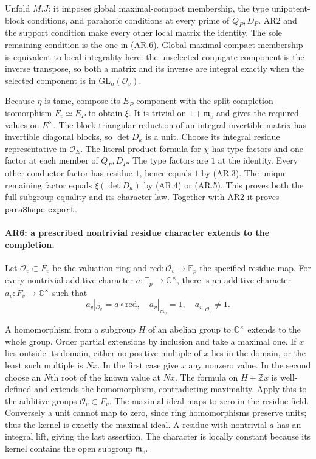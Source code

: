 Unfold $M.J$: it imposes global maximal-compact membership, the type
unipotent-block conditions, and parahoric conditions at every prime
of $Q_P,D_P$. AR2 and the support condition make every other local
matrix the identity. The sole remaining condition is the one in
(AR.6). Global maximal-compact membership is equivalent to local
integrality here: the unselected conjugate component is the inverse
transpose, so both a matrix and its inverse are integral exactly when
the selected component is in $\mathrm{GL}_n(\mathcal O_v)$.

Because $\eta$ is tame, compose its $E_P$ component with the split
completion isomorphism $F_v\simeq E_P$ to obtain $\xi$. It is trivial
on $1+\mathfrak m_v$ and gives the required values on $E^\times$.
The block-triangular reduction of an integral invertible matrix has
invertible diagonal blocks, so $\det D_\kappa$ is a unit. Choose its
integral residue representative in $\mathcal O_E$.
The literal product formula for $\chi$ has type factors and one
factor at each member of $Q_P,D_P$. The type factors are $1$ at the
identity. Every other conductor factor has residue $1$, hence equals
$1$ by (AR.3). The unique remaining factor equals
$\xi(\det D_\kappa)$ by (AR.4) or (AR.5).
This proves both the full subgroup equality and its character law.
Together with AR2 it proves $\texttt{paraShape\_export}$.

\paragraph{AR6: a prescribed nontrivial residue character extends to the completion.}
Let $\mathcal O_v\subset F_v$ be the valuation ring and
$\mathrm{red}:\mathcal O_v\to\mathbb F_p$ the specified residue map.
For every nontrivial additive character
$a:\mathbb F_p\to\mathbb C^\times$, there is an additive character
$a_v:F_v\to\mathbb C^\times$ such that
\[
 a_v|_{\mathcal O_v}=a\circ\mathrm{red},\quad
 a_v|_{\mathfrak m_v}=1,\quad
 a_v|_{\mathcal O_v}\ne1.                               \tag{AR.8}
\]

A homomorphism from a subgroup $H$ of an abelian group to
$\mathbb C^\times$ extends to the whole group. Order partial
extensions by inclusion and take a maximal one. If $x$ lies outside
its domain, either no positive multiple of $x$ lies in the domain,
or the least such multiple is $N x$. In the first case give $x$ any
nonzero value. In the second choose an $N$th root of the known value
at $Nx$. The formula on $H+\mathbb Zx$ is well-defined and extends
the homomorphism, contradicting maximality. Apply this to the
additive groups $\mathcal O_v\subset F_v$.
The maximal ideal maps to zero in the residue field. Conversely a
unit cannot map to zero, since ring homomorphisms preserve units;
thus the kernel is exactly the maximal ideal. A residue with
nontrivial $a$ has an integral lift, giving the last assertion.
The character is locally constant because its kernel contains the
open subgroup $\mathfrak m_v$.

